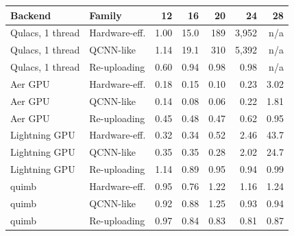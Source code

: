 \begin{tabular}{llrrrrr}
\toprule
Backend & Family & 12 & 16 & 20 & 24 & 28\\
\midrule
Qulacs, 1 thread & Hardware-eff. & 1.00 & 15.0 & 189 & 3{,}952 & n/a\\
Qulacs, 1 thread & QCNN-like & 1.14 & 19.1 & 310 & 5{,}392 & n/a\\
Qulacs, 1 thread & Re-uploading & 0.60 & 0.94 & 0.98 & 0.98 & n/a\\
Aer GPU & Hardware-eff. & 0.18 & 0.15 & 0.10 & 0.23 & 3.02\\
Aer GPU & QCNN-like & 0.14 & 0.08 & 0.06 & 0.22 & 1.81\\
Aer GPU & Re-uploading & 0.45 & 0.48 & 0.47 & 0.62 & 0.95\\
Lightning GPU & Hardware-eff. & 0.32 & 0.34 & 0.52 & 2.46 & 43.7\\
Lightning GPU & QCNN-like & 0.35 & 0.35 & 0.28 & 2.02 & 24.7\\
Lightning GPU & Re-uploading & 1.14 & 0.89 & 0.95 & 0.94 & 0.99\\
quimb & Hardware-eff. & 0.95 & 0.76 & 1.22 & 1.16 & 1.24\\
quimb & QCNN-like & 0.92 & 0.88 & 1.25 & 0.93 & 0.94\\
quimb & Re-uploading & 0.97 & 0.84 & 0.83 & 0.81 & 0.87\\
\bottomrule
\end{tabular}
